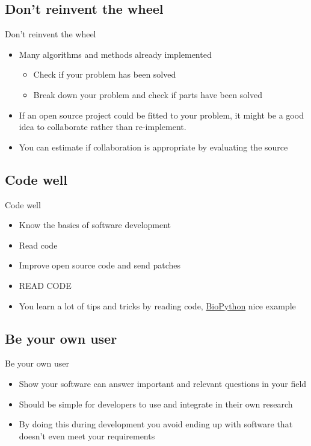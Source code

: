 \documentclass{beamer}
\begin{document}
\subsection{Don't reinvent the wheel}

\begin{frame}{Don't reinvent the wheel}

\begin{itemize}
\item Many algorithms and methods already implemented
\begin{itemize}
\item Check if your problem has been solved
\item Break down your problem and check if parts have been solved
\end{itemize}
\item If an open source project could be fitted to your problem, it might be a good idea to collaborate rather than re-implement.
\item You can estimate if collaboration is appropriate by evaluating the source 
\end{itemize}
\end{frame}

\subsection{Code well}

\begin{frame}{Code well}
\begin{itemize}
\item Know the basics of software development
\item Read code
\item Improve open source code and send patches
\pause
\item READ CODE
\item You learn a lot of tips and tricks by reading code, \href{https://github.com/biopython/biopython}{BioPython} nice example
\unpause
\end{itemize}

\end{frame}

\subsection{Be your own user}

\begin{frame}{Be your own user}
\begin{itemize}
\item Show your software can answer important and relevant questions in your field
\item Should be simple for developers to use and integrate in their own research
\item By doing this during development you avoid ending up with software that doesn't even meet your requirements
\end{itemize}

\end{frame}
\end{document}
